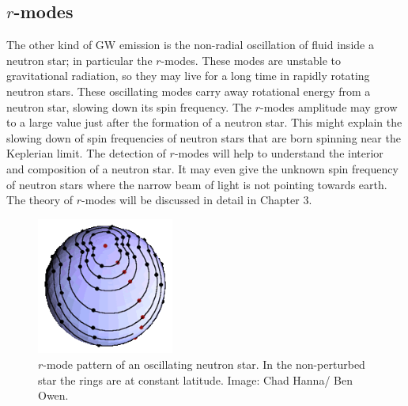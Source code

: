 \documentclass{ttuthes2007}
\begin{document}
\subsection{$r$-modes}
The other kind of \ac{GW} emission is the non-radial oscillation of fluid
inside a neutron star; in particular the $r$-modes. These modes are unstable to
gravitational radiation, so they may live for a long time in rapidly rotating neutron
stars. These oscillating modes carry away rotational energy from a neutron star,
slowing down its spin frequency. The $r$-modes amplitude may grow to a large value just
after the formation of a neutron star. This might explain the
slowing down of spin frequencies of neutron stars that are born spinning near the Keplerian
limit. The detection of $r$-modes will help to
understand the interior and composition of a neutron star. It may even give the
unknown spin frequency of neutron stars where the narrow beam of light is not
pointing towards earth. The theory of $r$-modes will be discussed in detail in
Chapter 3.
\begin{figure}
\centering
	\includegraphics[width=0.4\textwidth]{figure/333.png}
	\caption{$r$-mode pattern of an oscillating neutron star. In the
non-perturbed star the rings are at constant latitude. Image: Chad
Hanna/ Ben Owen.}
\end{figure}
\end{document}
